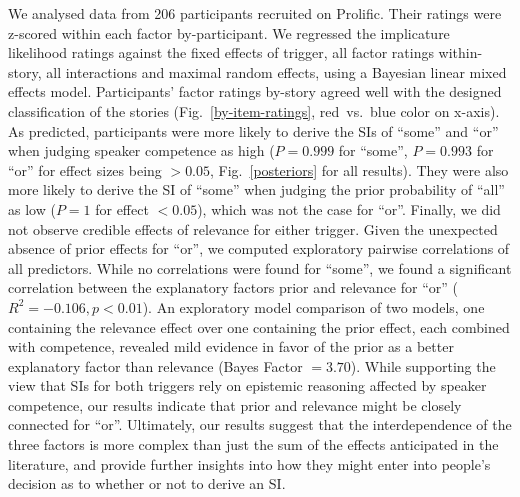 \documentclass[11pt,letterpaper]{article}
\begin{document}
We analysed data from 206 participants recruited on Prolific. Their ratings were z-scored within each factor by-participant. 
We regressed the implicature likelihood ratings against the fixed effects of trigger, all factor ratings within-story, all interactions and maximal  random effects, using a Bayesian linear mixed effects model. 
Participants' factor ratings by-story agreed well with the designed classification of the stories (Fig.~\ref{by-item-ratings}, red~vs.~blue color on x-axis).
As predicted, participants were more likely to derive the SIs of ``some'' and ``or'' when judging speaker competence as high ($P=0.999$ for ``some'',  $P=0.993$ for ``or'' for effect sizes being $>0.05$, Fig.~\ref{posteriors} for all results). 
They were also more likely to derive the SI of ``some'' when judging the prior probability of ``all'' as low ($P= 1$ for effect $<0.05$), which was not the case for ``or''. %
Finally, we did not observe credible effects of relevance for either trigger.
Given the unexpected absence of prior effects for ``or'', we computed exploratory pairwise correlations of all predictors. While no correlations were found for ``some'', we found a significant correlation between the explanatory factors prior and relevance for ``or'' ($R^2=-0.106, p<0.01$). %
An exploratory model comparison of two models, one containing the relevance effect over one containing the prior effect, each combined with competence, revealed mild evidence in favor of the prior as a better explanatory factor than relevance (Bayes Factor $ = 3.70$). %
While supporting the view that SIs for both triggers rely on epistemic reasoning affected by speaker competence, our results indicate that prior and relevance might be closely connected for ``or''.
Ultimately, our results suggest that the interdependence of the three factors is more complex than just the sum of the effects anticipated in the literature, and provide further insights into how they might enter into people’s decision as to whether or not to derive an SI.
\end{document}
